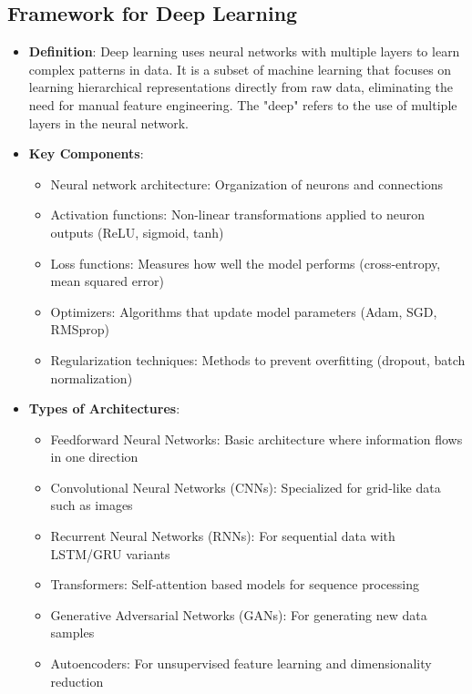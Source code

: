 \documentclass{article}
\begin{document}
\subsection{Framework for Deep Learning}
\begin{itemize}
    \item \textbf{Definition}: Deep learning uses neural networks with multiple layers to learn complex patterns in data. It is a subset of machine learning that focuses on learning hierarchical representations directly from raw data, eliminating the need for manual feature engineering. The "deep" refers to the use of multiple layers in the neural network.
    
    \item \textbf{Key Components}:
    \begin{itemize}
        \item Neural network architecture: Organization of neurons and connections
        \item Activation functions: Non-linear transformations applied to neuron outputs (ReLU, sigmoid, tanh)
        \item Loss functions: Measures how well the model performs (cross-entropy, mean squared error)
        \item Optimizers: Algorithms that update model parameters (Adam, SGD, RMSprop)
        \item Regularization techniques: Methods to prevent overfitting (dropout, batch normalization)
    \end{itemize}
    
    \item \textbf{Types of Architectures}:
    \begin{itemize}
        \item Feedforward Neural Networks: Basic architecture where information flows in one direction
        \item Convolutional Neural Networks (CNNs): Specialized for grid-like data such as images
        \item Recurrent Neural Networks (RNNs): For sequential data with LSTM/GRU variants
        \item Transformers: Self-attention based models for sequence processing
        \item Generative Adversarial Networks (GANs): For generating new data samples
        \item Autoencoders: For unsupervised feature learning and dimensionality reduction
    \end{itemize}
    

\end{itemize}
\end{document}
